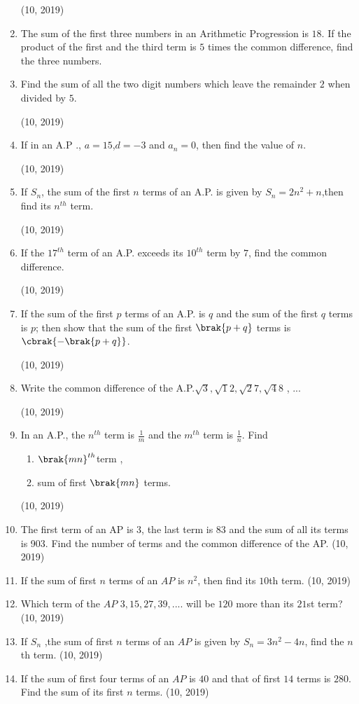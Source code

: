 \begin{enumerate}[label=\thesubsection.\arabic*,ref=\thesubsection.\theenumi,itemsep=1pt]
\hfill (10, 2019) \item The sum of the first three numbers in an Arithmetic Progression is $18$. If the product of the first and the third term is $5$ times the common
difference, find the three numbers.
 \item Find the sum of all the two digit numbers which leave the remainder $2$ when divided by $5$.

\hfill (10, 2019) \item If in an A.P ., $a=15$,$d=-3$ and $a_n=0$, then find the value of $n$.

\hfill (10, 2019) \item If ${S_n}$, the sum of the first ${n}$ terms of an A.P. is given by ${S_n = 2n^2 + n}$,then find its $n^{th}$ term. 

\hfill (10, 2019) \item If the $17^{th}$ term of an A.P. exceeds its $10^{th}$ term by $7$, find the common difference.

\hfill (10, 2019) \item If the sum of the first $p$ terms of an A.P. is $q$ and the sum of the first $q$ terms is $p$; then show that the sum of the first $\brak{p + q}$ terms is $\cbrak {-\brak {p + q}}$.

\hfill (10, 2019) \item Write the common difference of the A.P.${\sqrt3} , {\sqrt12} , {\sqrt27} , {\sqrt48}$ , ... 

\hfill (10, 2019) \item In an A.P., the $n^{th}$ term is ${\frac{1}{m}}$ and the $m^{th}$ term is $\frac{1}{n}$. Find 
\begin{enumerate}
      \item  $\brak{mn}^{th}$term  ,
      \item sum of first $\brak{mn}$ terms.
\end{enumerate}
\hfill (10, 2019)

 \item The first term of an AP is 3, the last term is 83 and the sum of all its terms is 903. Find the number of terms and the common difference of the AP.
\hfill (10, 2019) \item If the sum of first $n$ terms of an $AP$ is $n^2$, then find its $10$th term.
\hfill (10, 2019) \item Which term of the $AP$ $3, 15, 27, 39, ....$ will be $120$ more than its $21$st term?
\hfill (10, 2019) \item If $S_n$ ,the sum of first $n$ terms of an $AP$ is given by $S_n=3n^2-4n$, find the $n$th term.
\hfill (10, 2019) \item If the sum of first four terms of an $AP$ is $40$ and that of first $14$ terms is $280$. Find the sum of its first $n$ terms.
\hfill (10, 2019)


\end{enumerate}
